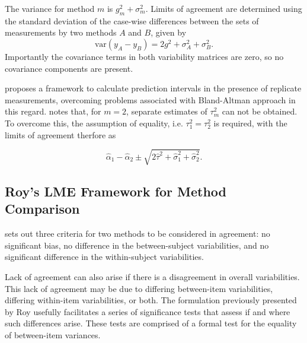 \documentclass[12pt, a4paper]{report}
\theoremstyle{plain}
\theoremstyle{definition}
\theoremstyle{remark}
\begin{document}
	The variance for method $m$ is $g^2_{m}+\sigma^2_{m}$. Limits of agreement are determined using the standard deviation of the case-wise differences between the sets of measurements by two methods $A$ and $B$, given by
	\begin{equation}
	\mbox{var} (y_{A}-y_{B}) = 2g^2 + \sigma^2_{A}+ \sigma^2_{B}.
	\end{equation}
	Importantly the covariance terms in both variability matrices are zero, so no covariance components are present. 
	
\citet{BXC2008} proposes a framework to calculate prediction intervals in the presence of replicate measurements, overcoming problems associated with Bland-Altman approach in this regard. \citet{BXC2008} notes that, for $m=2$, separate estimates of $\tau^2_m$ can not be obtained. To overcome this, the assumption of equality, i.e. $\tau^2_1 = \tau^2_2$ is required, with the limits of agreement therfore
	as
	
	\[
	\hat{\alpha}_1 - \hat{\alpha}_2 \pm \sqrt{2 \hat{\tau}^2 +
		\hat{\sigma}^2_1 + \hat{\sigma}^2_2}.
	\]
	
	
	
	
	
	
	
	
	
	\subsection{Roy's LME Framework for Method Comparison }
	\citet{Barnhart} sets out three criteria for two methods to be considered in agreement: no significant bias, no difference in the between-subject variabilities, and no significant difference in the within-subject variabilities. 
	
	
	Lack of agreement can also arise if there is a disagreement in overall variabilities. This lack of agreement may be due to differing between-item variabilities, differing within-item variabilities, or both. The formulation previously presented by Roy usefully facilitates a series of significance tests that assess if and where such differences arise. These tests are comprised of a formal test for the equality of between-item variances. 
	
\end{document}
